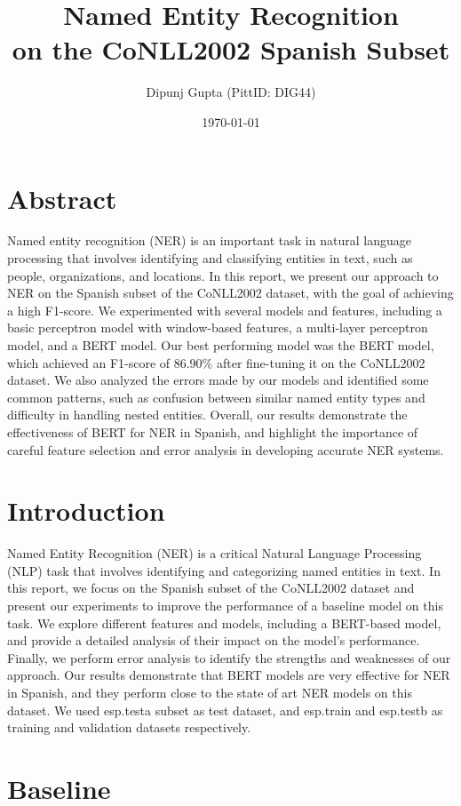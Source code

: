 \documentclass[12pt]{report}
\title{Named Entity Recognition \\on the CoNLL2002 Spanish Subset}
\author{Dipunj Gupta (PittID: DIG44)}
\date{\today}
\begin{document}
\maketitle

\section*{Abstract}

Named entity recognition (NER) is an important task in natural language processing that involves identifying and classifying entities in text, such as people, organizations, and locations. In this report, we present our approach to NER on the Spanish subset of the CoNLL2002 dataset, with the goal of achieving a high F1-score. We experimented with several models and features, including a basic perceptron model with window-based features, a multi-layer perceptron model, and a BERT model. Our best performing model was the BERT model, which achieved an F1-score of 86.90\% after fine-tuning it on the CoNLL2002 dataset. We also analyzed the errors made by our models and identified some common patterns, such as confusion between similar named entity types and difficulty in handling nested entities. Overall, our results demonstrate the effectiveness of BERT for NER in Spanish, and highlight the importance of careful feature selection and error analysis in developing accurate NER systems.

\section*{Introduction}

Named Entity Recognition (NER) is a critical Natural Language Processing (NLP) task that involves identifying and categorizing named entities in text. In this report, we focus on the Spanish subset of the CoNLL2002 dataset and present our experiments to improve the performance of a baseline model on this task. We explore different features and models, including a BERT-based model, and provide a detailed analysis of their impact on the model's performance. Finally, we perform error analysis to identify the strengths and weaknesses of our approach. Our results demonstrate that BERT models are very effective for NER in Spanish, and they perform close to the state of art NER models on this dataset. We used esp.testa subset as test dataset, and esp.train and esp.testb as training and validation datasets respectively.

\section*{Baseline}
\end{document}
